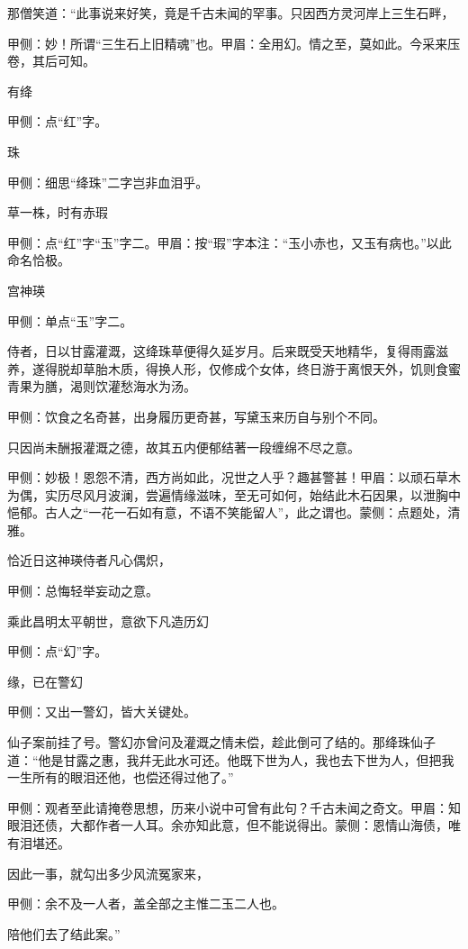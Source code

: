 \begin{parag}
    那僧笑道：“此事说来好笑，竟是千古未闻的罕事。只因西方灵河岸上三生石畔，\begin{note}甲侧：妙！所谓“三生石上旧精魂”也。甲眉：全用幻。情之至，莫如此。今采来压卷，其后可知。\end{note}有绛\begin{note}甲侧：点“红”字。\end{note}珠\begin{note}甲侧：细思“绛珠”二字岂非血泪乎。\end{note}草一株，时有赤瑕\begin{note}甲侧：点“红”字“玉”字二。甲眉：按“瑕”字本注：“玉小赤也，又玉有病也。”以此命名恰极。\end{note}宫神瑛\begin{note}甲侧：单点“玉”字二。\end{note}侍者，日以甘露灌溉，这绛珠草便得久延岁月。后来既受天地精华，复得雨露滋养，遂得脱却草胎木质，得换人形，仅修成个女体，终日游于离恨天外，饥则食蜜青果为膳，渴则饮灌愁海水为汤。\begin{note}甲侧：饮食之名奇甚，出身履历更奇甚，写黛玉来历自与别个不同。\end{note}只因尚未酬报灌溉之德，故其五内便郁结著一段缠绵不尽之意。\begin{note}甲侧：妙极！恩怨不清，西方尚如此，况世之人乎？趣甚警甚！甲眉：以顽石草木为偶，实历尽风月波澜，尝遍情缘滋味，至无可如何，始结此木石因果，以泄胸中悒郁。古人之“一花一石如有意，不语不笑能留人”，此之谓也。蒙侧：点题处，清雅。\end{note}恰近日这神瑛侍者凡心偶炽，\begin{note}甲侧：总悔轻举妄动之意。\end{note}乘此昌明太平朝世，意欲下凡造历幻\begin{note}甲侧：点“幻”字。\end{note}缘，已在警幻\begin{note}甲侧：又出一警幻，皆大关键处。\end{note}仙子案前挂了号。警幻亦曾问及灌溉之情未偿，趁此倒可了结的。那绛珠仙子道：“他是甘露之惠，我幷无此水可还。他既下世为人，我也去下世为人，但把我一生所有的眼泪还他，也偿还得过他了。”\begin{note}甲侧：观者至此请掩卷思想，历来小说中可曾有此句？千古未闻之奇文。甲眉：知眼泪还债，大都作者一人耳。余亦知此意，但不能说得出。蒙侧：恩情山海债，唯有泪堪还。\end{note}因此一事，就勾出多少风流冤家来，\begin{note}甲侧：余不及一人者，盖全部之主惟二玉二人也。\end{note}陪他们去了结此案。”
\end{parag}


